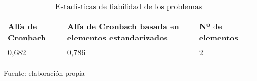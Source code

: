 \begin{table}[h]
    \caption {Estadísticas de fiabilidad de los problemas}
	\label{tab:fiabilidadProblemas}
	\setlength\extrarowheight{5pt}
	
	\begin{tabular}{p{5.7cm} p{4.6cm} p{2.8cm}}
	\toprule
	Alfa de Cronbach	& Alfa de Cronbach basada en elementos estandarizados	& Nº de elementos \\
	\midrule
	0,682				& 0,786					& 2 \\
	\bottomrule
	\end{tabular}
	
	\center
	\footnotesize
	Fuente: elaboración propia
\end{table}
